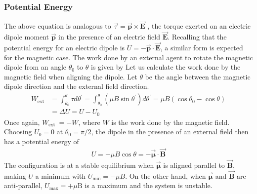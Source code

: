 \subsubsection{Potential Energy}
The above equation is analogous to $\vec{\tau}=\overrightarrow{\mathbf{p}} \times \overrightarrow{\mathbf{E}}$ , the torque exerted on an electric dipole moment $\overrightarrow{\mathbf{p}}$ in the presence of an electric field $\overrightarrow{\mathbf{E}}$. Recalling that the potential energy for an electric dipole is $U=-\overrightarrow{\mathbf{p}} \cdot \overrightarrow{\mathbf{E}}$, a similar form is expected for the magnetic case. The work done by an external agent to rotate the magnetic dipole from an angle $\theta_{0}$ to $\theta$ is given by
Let us calculate the work done by the magnetic field when aligning the dipole. Let $\theta$ be the angle between the magnetic dipole direction and the external field direction.\\
\begin{align*}
	W_{\mathrm{ext}} &=\int_{\theta_{0}}^{\theta} \tau d \theta^{\prime}=\int_{\theta_{0}}^{\theta}\left(\mu B \sin \theta^{\prime}\right) d \theta^{\prime}=\mu B\left(\cos \theta_{0}-\cos \theta\right) \\
	&=\Delta U=U-U_{0}
\end{align*}
Once again, $W_{\text {ext }}=-W$, where $W$ is the work done by the magnetic field. Choosing $U_{0}=0$ at $\theta_{0}=\pi / 2$, the dipole in the presence of an external field then has a potential energy of
\begin{align*}
U=-\mu B \cos \theta=-\overrightarrow{\boldsymbol{\mu}} \cdot \overrightarrow{\mathbf{B}}
\end{align*}
The configuration is at a stable equilibrium when $\overrightarrow{\boldsymbol{\mu}}$ is aligned parallel to $\overrightarrow{\mathbf{B}}$, making $U$ a minimum with $U_{\min }=-\mu B$. On the other hand, when $\overrightarrow{\boldsymbol{\mu}}$ and $\overrightarrow{\mathbf{B}}$ are anti-parallel, $U_{\max }=+\mu \mathrm{B}$ is a maximum and the system is unstable.
\begin{center}
\end{center}

